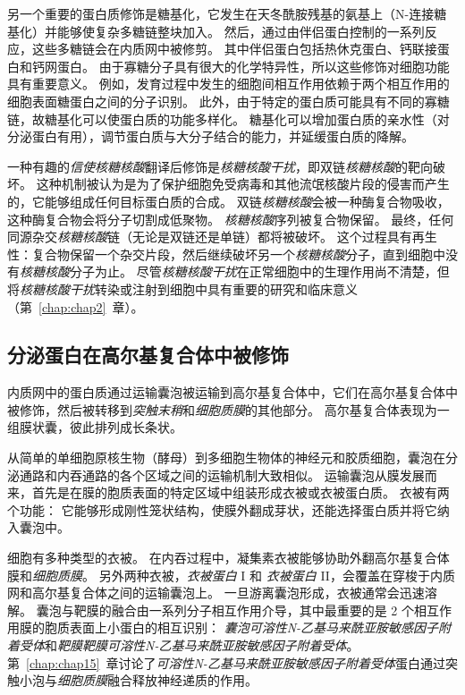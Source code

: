 另一个重要的蛋白质修饰是糖基化，它发生在天冬酰胺残基的氨基上（N-连接糖基化）并能够使复杂多糖链整块加入。
然后，通过由伴侣蛋白控制的一系列反应，这些多糖链会在内质网中被修剪。
其中伴侣蛋白包括热休克蛋白、钙联接蛋白和钙网蛋白。
由于寡糖分子具有很大的化学特异性，所以这些修饰对细胞功能具有重要意义。
例如，发育过程中发生的细胞间相互作用依赖于两个相互作用的细胞表面糖蛋白之间的分子识别。
此外，由于特定的蛋白质可能具有不同的寡糖链，故糖基化可以使蛋白质的功能多样化。
糖基化可以增加蛋白质的亲水性（对分泌蛋白有用），调节蛋白质与大分子结合的能力，并延缓蛋白质的降解。


一种有趣的\textit{信使核糖核酸}翻译后修饰是\textit{核糖核酸干扰}，即双链\textit{核糖核酸}的靶向破坏。
这种机制被认为是为了保护细胞免受病毒和其他流氓核酸片段的侵害而产生的，它能够组成任何目标蛋白质的合成。 
双链\textit{核糖核酸}会被一种酶复合物吸收，这种酶复合物会将分子切割成低聚物。
\textit{核糖核酸}序列被复合物保留。
最终，任何同源杂交\textit{核糖核酸}链（无论是双链还是单链）都将被破坏。
这个过程具有再生性：复合物保留一个杂交片段，然后继续破坏另一个\textit{核糖核酸}分子，直到细胞中没有\textit{核糖核酸}分子为止。
尽管\textit{核糖核酸干扰}在正常细胞中的生理作用尚不清楚，但将\textit{核糖核酸干扰}转染或注射到细胞中具有重要的研究和临床意义（第~\ref{chap:chap2}~章）。



\subsection{分泌蛋白在高尔基复合体中被修饰}

内质网中的蛋白质通过运输囊泡被运输到高尔基复合体中，它们在高尔基复合体中被修饰，然后被转移到\textit{突触末稍}和\textit{细胞质膜}的其他部分。
高尔基复合体表现为一组膜状囊，彼此排列成长条状。


从简单的单细胞原核生物（酵母）到多细胞生物体的神经元和胶质细胞，囊泡在分泌通路和内吞通路的各个区域之间的运输机制大致相似。
运输囊泡从膜发展而来，首先是在膜的胞质表面的特定区域中组装形成衣被或衣被蛋白质。
衣被有两个功能：
它能够形成刚性笼状结构，使膜外翻成芽状，还能选择蛋白质并将它纳入囊泡中。


细胞有多种类型的衣被。
在内吞过程中，凝集素衣被能够协助外翻高尔基复合体膜和\textit{细胞质膜}。
另外两种衣被，\textit{衣被蛋白} I 和 \textit{衣被蛋白} II，会覆盖在穿梭于内质网和高尔基复合体之间的运输囊泡上。
一旦游离囊泡形成，衣被通常会迅速溶解。
囊泡与靶膜的融合由一系列分子相互作用介导，其中最重要的是 2 个相互作用膜的胞质表面上小蛋白的相互识别：
\textit{囊泡可溶性N-乙基马来酰亚胺敏感因子附着受体}和\textit{靶膜靶膜可溶性N-乙基马来酰亚胺敏感因子附着受体}。
第~\ref{chap:chap15}~章讨论了\textit{可溶性N-乙基马来酰亚胺敏感因子附着受体}蛋白通过突触小泡与\textit{细胞质膜}融合释放神经递质的作用。


